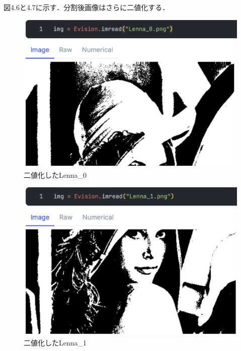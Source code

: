 \documentclass[a4paper]{jreport}	%
\begin{document}
図4.6と4.7に示す．分割後画像はさらに二値化する．
\begin{figure}[H]
\vspace{6cm}
\begin{center}
\hspace{-8cm}
\includegraphics[scale=0.5]{ja/f6.png}
\end{center}
\caption{二値化したLenna\_0}
\end{figure}

\begin{figure}[H]
\vspace{5cm}
\begin{center}
\hspace{-8cm}
\includegraphics[scale=0.5]{ja/f7.png}
\end{center}
\caption{二値化したLenna\_1}
\end{figure}
\end{document}
